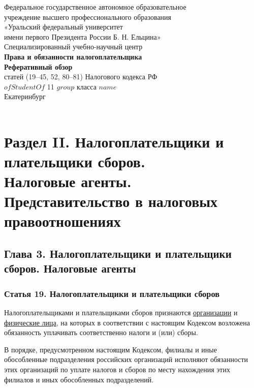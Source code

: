 \documentclass{report}
\begin{document}
\begin{titlepage}
    \center
    \Large

    Федеральное государственное автономное образовательное\\
    учреждение высшего профессионального образования\\
    «Уральский федеральный университет\\
    имени первого Президента России Б. Н. Ельцина»\\
    Специализированный учебно-научный центр\\

    \vfill
    \textbf{Права и обязанности налогоплательщика}\\
    \textbf{Реферативный обзор}\\
    статей (19--45, 52, 80--81) Налогового кодекса РФ\\
    $ofStudentOf$ 11 $group$ класса $name$\\

    \vfill
    {Екатеринбург}\\
    {\the\year}\\
\end{titlepage}

\section{{\bf Раздел II. Налогоплательщики и плательщики сборов.}\\{\bf Налоговые агенты. Представительство в налоговых правоотношениях}}
\subsection{{\bf Глава 3. Налогоплательщики и плательщики сборов. Налоговые агенты}}
\subsubsection{{\bf Статья 19.} Налогоплательщики и плательщики сборов}
\par Налогоплательщиками и плательщиками сборов признаются \ul{организации} и \ul{физические лица}, на которых в соответствии с настоящим Кодексом возложена обязанность уплачивать соответственно налоги и (или) сборы.
\par В порядке, предусмотренном настоящим Кодексом, филиалы и иные обособленные подразделения российских организаций исполняют обязанности этих организаций по уплате налогов и сборов по месту нахождения этих филиалов и иных обособленных подразделений.
\end{document}
